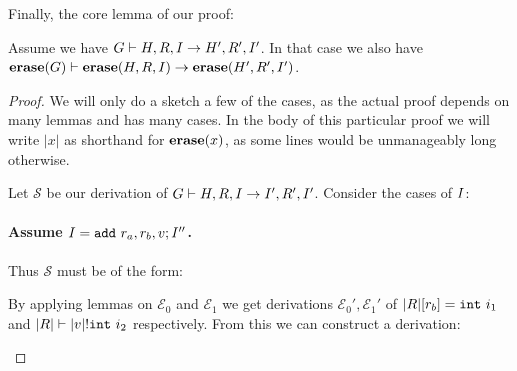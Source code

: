 Finally, the core lemma of our proof:

\begin{lemma}
  \label{lemma:erasestep}
  Assume we have
  $\execis{\high G}{\high H, \high R, \high I}{\high H', \high R', \high
    I'}$. In that case we also have
  $\execis{\erase(\high G)}{\erase(\high H, \high R, \high I)}{\erase(\high H',
    \high R', \high I')}$.
\end{lemma}
\begin{proof}
  We will only do a sketch a few of the cases, as the actual proof depends on
  many lemmas and has many cases. In the body of this particular proof we will
  write $|x|$ as shorthand for $\erase(x)$, as some lines would be unmanageably
  long otherwise.

  Let $\mathcal{S}$ be our derivation of
  $\execis{\high G}{\high H, \high R, \high I}{\high I', \high R', \high
    I'}$. Consider the cases of $\high I$:

  \paragraph{Assume $\high I = \mathtt{add}\ r_a, r_b, \high v ; \high I''$.}
  Thus $\mathcal{S}$ must be of the form:

  \begin{mathpar}
  \end{mathpar}

  By applying lemmas on $\mathcal{E}_0$ and $\mathcal{E}_1$ we get derivations
  $\mathcal{E}_0', \mathcal{E}_1'$ of $|\high R| [r_b] = \mathtt{int}\ i_1$ and
  $\evalregs{|\high R|}{|\high v|}{\mathtt{int}\ i_2}$ respectively. From this
  we can construct a derivation:

  \begin{mathpar}
  \end{mathpar}


\end{proof}
